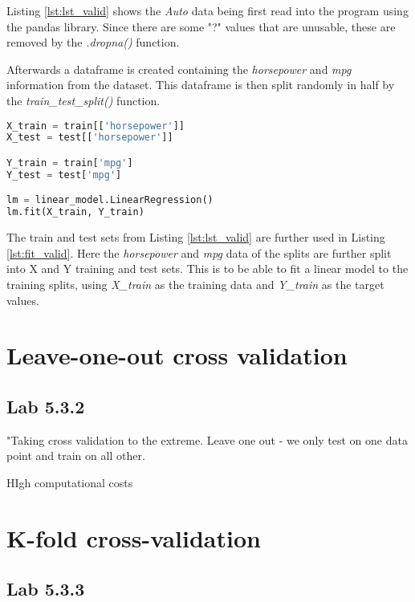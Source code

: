 Listing \ref{lst:lst_valid} shows the \emph{Auto} data being first read into the program using the pandas library. Since there are some "?" values that are unusable, these are removed by the \emph{.dropna()} function.

Afterwards a dataframe is created containing the \emph{horsepower} and \emph{mpg} information from the dataset. This dataframe is then split randomly in half by the \emph{train\_test\_split()} function. 

\begin{lstlisting}[language=Python, label=lst:fit_valid, caption=Fit linear regression]
X_train = train[['horsepower']]
X_test = test[['horsepower']]

Y_train = train['mpg']
Y_test = test['mpg']

lm = linear_model.LinearRegression()
lm.fit(X_train, Y_train)
\end{lstlisting}

The train and test sets from Listing \ref{lst:lst_valid} are further used in Listing \ref{lst:fit_valid}. Here the \emph{horsepower} and \emph{mpg} data of the splits are further split into X and Y training and test sets. This is to be able to fit a linear model to the training splits, using \emph{X\_train} as the training data and \emph{Y\_train} as the target values.

\section{Leave-one-out cross validation}


\subsection{Lab 5.3.2}
"Taking cross validation to the extreme. Leave one out - we only test on one data point and train on all other.

HIgh computational costs


\section{K-fold cross-validation}


\subsection{Lab 5.3.3}